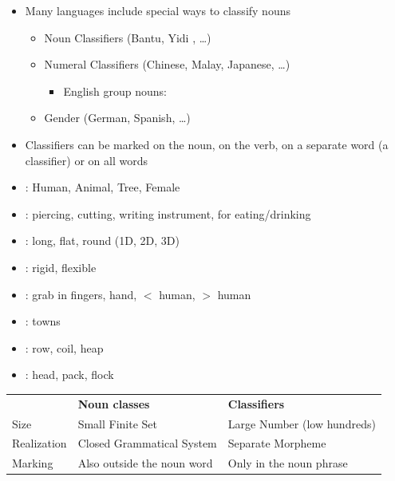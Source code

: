 \documentclass[headrule,footrule]{foils}
\begin{document}
\MyLogo{}
\begin{itemize}
\item  Many languages include special ways to classify 
nouns
\begin{itemize}
\item  Noun Classifiers (Bantu, Yidi , \ldots) 
\item  Numeral Classifiers (Chinese, Malay, Japanese, \ldots)
  \begin{itemize}
  \item English group nouns: 
  \end{itemize}
\item  Gender (German, Spanish, \ldots)  
\end{itemize}
\item Classifiers can be marked on the noun, on the verb, on a
  separate word (a classifier) or on all words
\end{itemize}

\begin{itemize}
\item {}: Human, Animal, Tree, Female
\item {}: piercing, cutting, writing instrument, for eating/drinking
\item {}: long, flat, round (1D, 2D, 3D)
\item {}: rigid, flexible
\item {}: grab in fingers, hand, $<$ human, $>$ human
\item {}: towns
\item {}: row, coil, heap
\item {}: head, pack, flock
\end{itemize}


\noindent\begin{tabular}{lll}
  & \textbf{Noun classes} & \textbf{Classifiers} \\
Size & Small Finite Set & Large Number (low hundreds) \\
Realization & Closed Grammatical System & Separate Morpheme \\
Marking & Also outside the noun word & Only in the noun phrase
\end{tabular}
\end{document}
